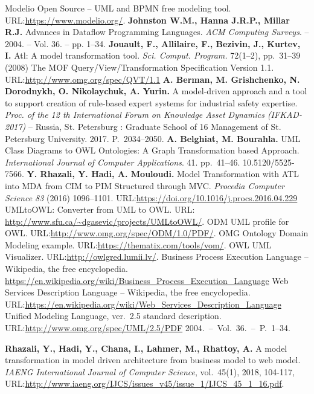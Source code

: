 \documentclass[runningheads]{llncs}
\begin{document}
\begin{thebibliography}{11}
 Modelio Open Source -- UML and BPMN free modeling tool. URL:\url{https://www.modelio.org/}.
 \textbf{Johnston W.M., Hanna J.R.P., Millar R.J.} Advances in Dataflow Programming Languages.
  \emph{ACM Computing Surveys}. -- 2004. -- Vol. 36. -- pp. 1--34.
 \textbf{Jouault, F., Allilaire, F., Bezivin, J., Kurtev, I.} Atl: A model transformation tool. \emph{Sci. Comput. Program.} 72(1--2), pp.~31--39 (2008)
 The MOF Query/View/Transformation Specification Version 1.1. URL:\url{http://www.omg.org/spec/QVT/1.1}
 \textbf{A. Berman, M. Grishchenko, N. Dorodnykh, O. Nikolaychuk, A. Yurin.} A model-driven approach and a tool to support creation of rule-based expert systems for industrial safety expertise. \emph{Proc. of the 12 th International Forum on Knowledge Asset Dynamics (IFKAD-2017)} -- Russia, St. Petersburg : Graduate School of 16 Management of St. Petersburg University.  2017.  P.~2034--2050.
 \textbf{A. Belghiat, M. Bourahla.} UML Class Diagrams to OWL Ontologies: A Graph Transformation based Approach. \emph{International Journal of Computer Applications}. 41. pp.~41--46. 10.5120/5525-7566.
\textbf{Y. Rhazali, Y. Hadi, A. Mouloudi.} Model Transformation with ATL into MDA from CIM to PIM Structured through MVC. \emph{Procedia Computer Science 83} (2016) 1096–1101. URL:\url{https://doi.org/10.1016/j.procs.2016.04.229}
 UMLtoOWL: Converter from UML to OWL. URL: \url{http://www.sfu.ca/~dgasevic/projects/UMLtoOWL/}.
 ODM UML profile for OWL. URL:\url{http://www.omg.org/spec/ODM/1.0/PDF/}.
 OMG Ontology Domain Modeling example. URL:\url{https://thematix.com/tools/vom/}.
 OWL UML Visualizer. URL:\url{http://owlgred.lumii.lv/}.
 Business Process Execution Language -- Wikipedia, the free encyclopedia. \url{https://en.wikipedia.org/wiki/Business_Process_Execution_Language}
 Web Services Description Language -- Wikipedia, the free encyclopedia.  URL:\url{https://en.wikipedia.org/wiki/Web_Services_Description_Language}
 Unified Modeling Language, ver.~2.5 standard description. URL:\url{http://www.omg.org/spec/UML/2.5/PDF}
  2004.~--~Vol.~36.~--~P.~1--34.

\textbf{Rhazali, Y., Hadi, Y., Chana, I., Lahmer, M., Rhattoy, A.} A model
transformation in model driven architecture from business model to web
model. \emph{IAENG International Journal of Computer Science}, vol.~45(1), 2018, 104-117, URL:\url{http://www.iaeng.org/IJCS/issues_v45/issue_1/IJCS_45_1_16.pdf}.


\end{thebibliography}
\end{document}
